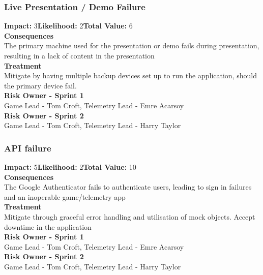 \documentclass[11pt]{article}
\begin{document}
\subsubsection{Live Presentation / Demo Failure}
\textbf{Impact:} 3\quad \textbf{Likelihood:} 2\quad \textbf{Total Value:} 6\\
\textbf{Consequences}\\
The primary machine used for the presentation or demo fails during presentation, resulting in a lack of content in the presentation\\
\textbf{Treatment}\\
Mitigate by having multiple backup devices set up to run the application, should the primary device fail.\\
\textbf{Risk Owner - Sprint 1}\\
Game Lead - Tom Croft, Telemetry Lead - Emre Acarsoy\\
\textbf{Risk Owner - Sprint 2}\\
Game Lead - Tom Croft, Telemetry Lead - Harry Taylor
\subsubsection{API failure}
\textbf{Impact:} 5\quad \textbf{Likelihood:} 2\quad \textbf{Total Value:} 10\\
\textbf{Consequences}\\
The Google Authenticator fails to authenticate users, leading to sign in failures and an inoperable game/telemetry app\\
\textbf{Treatment}\\
Mitigate through graceful error handling and utilisation of mock objects. Accept downtime in the application\\
\textbf{Risk Owner - Sprint 1}\\
Game Lead - Tom Croft, Telemetry Lead - Emre Acarsoy\\
\textbf{Risk Owner - Sprint 2}\\
Game Lead - Tom Croft, Telemetry Lead - Harry Taylor
\end{document}
